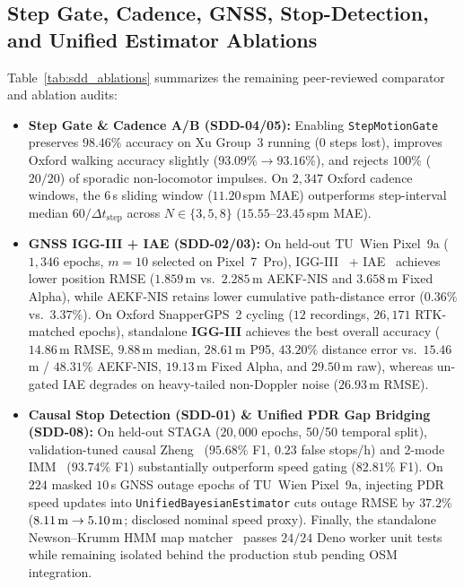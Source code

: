 \subsection{Step Gate, Cadence, GNSS, Stop-Detection, and Unified Estimator Ablations}
Table~\ref{tab:sdd_ablations} summarizes the remaining peer-reviewed comparator and ablation audits:
\begin{itemize}
    \item \textbf{Step Gate \& Cadence A/B (SDD-04/05):} Enabling \texttt{StepMotionGate} preserves $98.46\%$ accuracy on Xu Group~3 running ($0$ steps lost), improves Oxford walking accuracy slightly ($93.09\% \to 93.16\%$), and rejects $100\%$ ($20/20$) of sporadic non-locomotor impulses. On $2{,}347$ Oxford cadence windows, the $6$\,s sliding window ($11.20$\,spm MAE) outperforms step-interval median $60/\Delta t_{\text{step}}$ across $N\in\{3,5,8\}$ ($15.55$--$23.45$\,spm MAE).
    \item \textbf{GNSS IGG-III + IAE (SDD-02/03):} On held-out TU~Wien Pixel~9a ($1{,}346$ epochs, $m=10$ selected on Pixel~7~Pro), IGG-III~\cite{yang2001igg3} + IAE~\cite{mohamed1999iae} achieves lower position RMSE ($1.859$\,m vs.\ $2.285$\,m AEKF-NIS and $3.658$\,m Fixed Alpha), while AEKF-NIS retains lower cumulative path-distance error ($0.36\%$ vs.\ $3.37\%$). On Oxford SnapperGPS~2 cycling ($12$ recordings, $26{,}171$ RTK-matched epochs), standalone \textbf{IGG-III} achieves the best overall accuracy ($14.86$\,m RMSE, $9.88$\,m median, $28.61$\,m P95, $43.20\%$ distance error vs.\ $15.46$\,m / $48.31\%$ AEKF-NIS, $19.13$\,m Fixed Alpha, and $29.50$\,m raw), whereas un-gated IAE degrades on heavy-tailed non-Doppler noise ($26.93$\,m RMSE).
    \item \textbf{Causal Stop Detection (SDD-01) \& Unified PDR Gap Bridging (SDD-08):} On held-out STAGA ($20{,}000$ epochs, 50/50 temporal split), validation-tuned causal Zheng~\cite{zheng2009mining} ($95.68\%$ F1, $0.23$ false stops/h) and 2-mode IMM~\cite{blom1988imm} ($93.74\%$ F1) substantially outperform speed gating ($82.81\%$ F1). On $224$ masked $10$\,s GNSS outage epochs of TU~Wien Pixel~9a, injecting PDR speed updates into \texttt{UnifiedBayesianEstimator} cuts outage RMSE by $37.2\%$ ($8.11\text{\,m} \to 5.10\text{\,m}$; disclosed nominal speed proxy). Finally, the standalone Newson--Krumm HMM map matcher~\cite{newson2009hidden} passes $24/24$ Deno worker unit tests while remaining isolated behind the production stub pending OSM integration.
\end{itemize}

